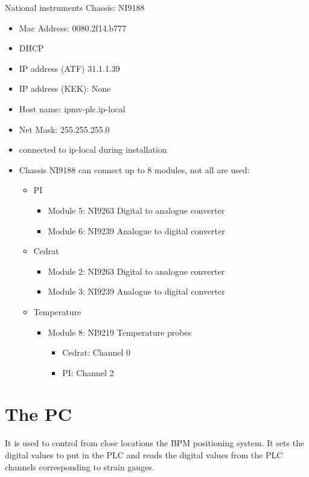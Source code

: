 National instruments Chassis: NI9188
\begin{itemize}
\item Mac Address: 0080.2f14.b777
\item DHCP
\item IP address (ATF) 31.1.1.39
\item IP address (KEK): None
\item Host name: ipmv-plc.ip-local
\item Net Mask: 255.255.255.0
\item connected to ip-local during installation
\item Chassis NI9188 can connect up to 8 modules, not all are used:
\begin{itemize}
\item PI
\begin{itemize}
\item Module 5: NI9263 Digital to analogue converter
\item Module 6: NI9239 Analogue to digital converter
\end{itemize}
\item Cedrat
\begin{itemize}
\item Module 2: NI9263 Digital to analogue converter
\item Module 3: NI9239 Analogue to digital converter
\end{itemize}
\item Temperature
\begin{itemize}
\item Module 8: NI9219 Temperature probes
\begin{itemize}
\item Cedrat: 	Channel 0
\item PI: Channel 2
\end{itemize}
\end{itemize}
\end{itemize}
\end{itemize}

\section{The PC}
It is used to control from close locations the BPM positioning system. It sets the digital values to put in the PLC and reads the digital values from the PLC channels corresponding to strain gauges.\par


